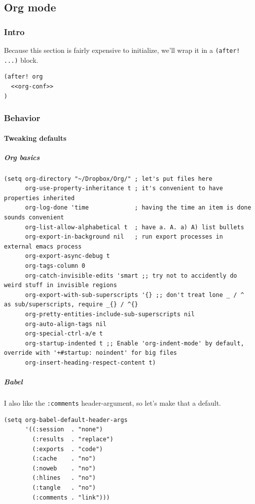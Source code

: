 \documentclass[11pt]{article}
\begin{document}
\subsection{Org mode}
\label{org}
\subsubsection{Intro}
\label{sec:org0f59973}
Because this section is fairly expensive to initialize, we'll wrap it in a
\texttt{(after! ...)} block.

\begin{verbatim}
(after! org
  <<org-conf>>
)
\end{verbatim}

\subsubsection{Behavior}
\label{sec:orgc108e19}
\paragraph{Tweaking defaults}
\label{sec:orgda0eff7}
\subparagraph{Org basics}
\label{sec:org6cad650}

\begin{verbatim}
(setq org-directory "~/Dropbox/Org/" ; let's put files here
      org-use-property-inheritance t ; it's convenient to have properties inherited
      org-log-done 'time             ; having the time an item is done sounds convenient
      org-list-allow-alphabetical t  ; have a. A. a) A) list bullets
      org-export-in-background nil   ; run export processes in external emacs process
      org-export-async-debug t
      org-tags-column 0
      org-catch-invisible-edits 'smart ;; try not to accidently do weird stuff in invisible regions
      org-export-with-sub-superscripts '{} ;; don't treat lone _ / ^ as sub/superscripts, require _{} / ^{}
      org-pretty-entities-include-sub-superscripts nil
      org-auto-align-tags nil
      org-special-ctrl-a/e t
      org-startup-indented t ;; Enable 'org-indent-mode' by default, override with '+#startup: noindent' for big files
      org-insert-heading-respect-content t)
\end{verbatim}

\subparagraph{Babel}
\label{sec:orgb6739d0}
I also like the \texttt{:comments} header-argument, so let's make that a
default.

\begin{verbatim}
(setq org-babel-default-header-args
      '((:session  . "none")
        (:results  . "replace")
        (:exports  . "code")
        (:cache    . "no")
        (:noweb    . "no")
        (:hlines   . "no")
        (:tangle   . "no")
        (:comments . "link")))
\end{verbatim}
\end{document}
